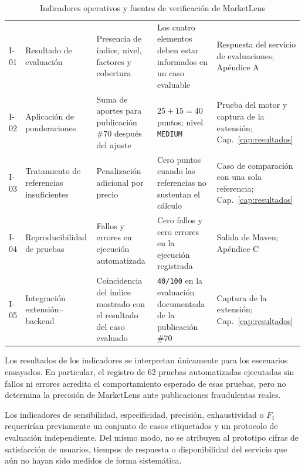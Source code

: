 \begin{table}[H]
    \centering
    \caption{Indicadores operativos y fuentes de verificación de MarketLens}
    \label{tab:ml-indicadores}
    \scriptsize
    \begin{tabularx}{\textwidth}{l L L L L}
        \toprule
         &  &  &  &  \\
        \midrule
        I-01 & Resultado de evaluación & Presencia de índice, nivel, factores y cobertura & Los cuatro elementos deben estar informados en un caso evaluable & Respuesta del servicio de evaluaciones; Apéndice A \\
        I-02 & Aplicación de ponderaciones & Suma de aportes para publicación \#70 después del ajuste & $25+15=40$ puntos; nivel \texttt{MEDIUM} & Prueba del motor y captura de la extensión; Cap.~\ref{cap:resultados} \\
        I-03 & Tratamiento de referencias insuficientes & Penalización adicional por precio & Cero puntos cuando las referencias no sustentan el cálculo & Caso de comparación con una sola referencia; Cap.~\ref{cap:resultados} \\
        I-04 & Reproducibilidad de pruebas & Fallos y errores en ejecución automatizada & Cero fallos y cero errores en la ejecución registrada & Salida de Maven; Apéndice C \\
        I-05 & Integración extensión--backend & Coincidencia del índice mostrado con el resultado del caso evaluado & \texttt{40/100} en la evaluación documentada de la publicación \#70 & Captura de la extensión; Cap.~\ref{cap:resultados} \\
        \bottomrule
    \end{tabularx}
\end{table}

Los resultados de los indicadores se interpretan únicamente para los escenarios ensayados. En particular, el registro de 62 pruebas automatizadas ejecutadas sin fallos ni errores acredita el comportamiento esperado de esas pruebas, pero no determina la precisión de MarketLens ante publicaciones fraudulentas reales.

Los indicadores de sensibilidad, especificidad, precisión, exhaustividad o $F_1$ requerirían previamente un conjunto de casos etiquetados y un protocolo de evaluación independiente. Del mismo modo, no se atribuyen al prototipo cifras de satisfacción de usuarios, tiempos de respuesta o disponibilidad del servicio que aún no hayan sido medidos de forma sistemática.

